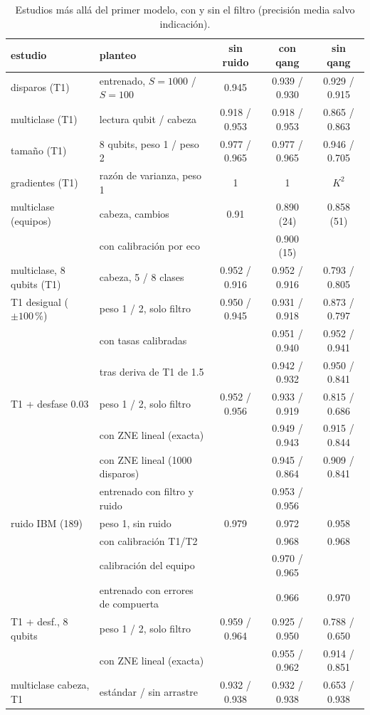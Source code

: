 \documentclass[11pt]{article}
\begin{document}
\begin{table}[h]
\centering\small
\setlength{\tabcolsep}{3pt}
\begin{tabular}{llccc}
\toprule
estudio & planteo & sin ruido & con qang & sin qang\\
\midrule
disparos (T1) & entrenado, $S=1000$ / $S=100$ & 0.945 & 0.939 / 0.930 & 0.929 / 0.915\\
multiclase (T1) & lectura qubit / cabeza & 0.918 / 0.953 & 0.918 / 0.953 & 0.865 / 0.863\\
tamaño (T1) & 8 qubits, peso 1 / peso 2 & 0.977 / 0.965 & 0.977 / 0.965 & 0.946 / 0.705\\
gradientes (T1) & razón de varianza, peso 1 & 1 & 1 & $K^2$\\
multiclase (equipos) & cabeza, cambios & 0.91 & 0.890 (24) & 0.858 (51)\\
 & \quad con calibración por eco & & 0.900 (15) & \\
multiclase, 8 qubits (T1) & cabeza, 5 / 8 clases & 0.952 / 0.916 & 0.952 / 0.916 & 0.793 / 0.805\\
T1 desigual ($\pm100\,\%$) & peso 1 / 2, solo filtro & 0.950 / 0.945 & 0.931 / 0.918 & 0.873 / 0.797\\
 & \quad con tasas calibradas & & 0.951 / 0.940 & 0.952 / 0.941\\
 & \quad tras deriva de T1 de 1.5 & & 0.942 / 0.932 & 0.950 / 0.841\\
T1 + desfase 0.03 & peso 1 / 2, solo filtro & 0.952 / 0.956 & 0.933 / 0.919 & 0.815 / 0.686\\
 & \quad con ZNE lineal (exacta) & & 0.949 / 0.943 & 0.915 / 0.844\\
 & \quad con ZNE lineal (1000 disparos) & & 0.945 / 0.864 & 0.909 / 0.841\\
 & \quad entrenado con filtro y ruido & & 0.953 / 0.956 & \\
ruido IBM (189) & peso 1, sin ruido & 0.979 & 0.972 & 0.958\\
 & \quad con calibración T1/T2 & & 0.968 & 0.968\\
 & \quad calibración del equipo & & 0.970 / 0.965 & \\
 & \quad entrenado con errores de compuerta & & 0.966 & 0.970\\
T1 + desf., 8 qubits & peso 1 / 2, solo filtro & 0.959 / 0.964 & 0.925 / 0.950 & 0.788 / 0.650\\
 & \quad con ZNE lineal (exacta) & & 0.955 / 0.962 & 0.914 / 0.851\\
multiclase cabeza, T1 & estándar / sin arrastre & 0.932 / 0.938 & 0.932 / 0.938 & 0.653 / 0.938\\
\bottomrule
\end{tabular}
\caption{Estudios más allá del primer modelo, con y sin el filtro (precisión media salvo indicación).}
\label{tab:mas}
\end{table}
\end{document}

